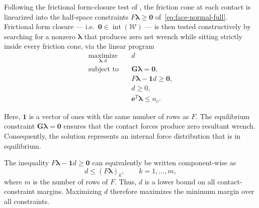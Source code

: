 Following the frictional form-closure test of
\cite[Sec.~28.4.2]{prattichizzo2008grasping}, the friction cone at each
contact is linearized into the half-space constraints
$F\boldsymbol{\lambda} \ge \mathbf{0}$ of~\eqref{eq:face-normal-full}.
Frictional form closure --- i.e.\ $\mathbf{0} \in
\operatorname{int}(\mathcal{W})$ --- is then tested constructively by
searching for a nonzero $\boldsymbol{\lambda}$ that produces zero net wrench
while sitting strictly inside every friction cone, via the linear program
\begin{equation}
\begin{aligned}
    \underset{\boldsymbol{\lambda},d}{\operatorname{maximize}}
    \quad & d \\[2mm]
    \text{subject to}
    \quad & \boldsymbol{G}\boldsymbol{\lambda} = \boldsymbol{0},\\
    & F\boldsymbol{\lambda} - \boldsymbol{1}d \geq \boldsymbol{0},\\
    & d \geq 0,\\
    & \boldsymbol{e}^{T}\boldsymbol{\lambda} \leq n_c.
\end{aligned}
\label{eq:lp2}
\end{equation}

Here, $\boldsymbol{1}$ is a vector of ones with the same number of rows as
$F$. The equilibrium constraint $\boldsymbol{G}\boldsymbol{\lambda}=\boldsymbol{0}$
ensures that the contact forces produce zero resultant wrench. Consequently,
the solution represents an internal force distribution that is in
equilibrium.

The inequality $F\boldsymbol{\lambda} - \boldsymbol{1}d \geq \boldsymbol{0}$
can equivalently be written component-wise as
\begin{equation}
    d \leq (F\boldsymbol{\lambda})_k,
    \qquad
    k=1,\ldots,m,
\end{equation}
where $m$ is the number of rows of $F$. Thus, $d$ is a lower bound on all
contact-constraint margins. Maximizing $d$ therefore maximizes the minimum
margin over all constraints.

